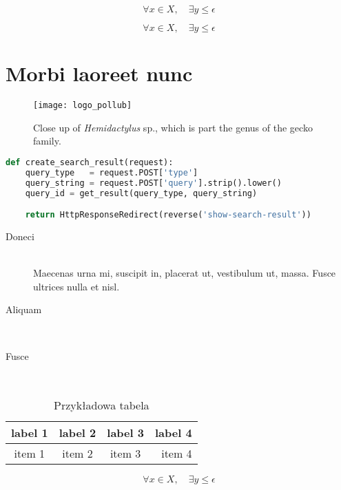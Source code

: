 \lipsum[6]

\begin{equation}
 \forall x \in X, \quad \exists y \leq \epsilon
\end{equation}

\lipsum[7]

\begin{equation}
 \forall x \in X, \quad \exists y \leq \epsilon
\end{equation}

\lipsum[8]

\section{Morbi laoreet nunc}

\lipsum[9]

\begin{figure}[ht]
  \centering
  \texttt{[image: logo\_pollub]}
  \caption[Close up of \textit{Hemidactylus} sp.]%
  {Close up of \textit{Hemidactylus} sp., which is
  part the genus of the gecko family.}
\end{figure}

\lipsum[10]

\begin{lstlisting}[language=Python,caption={Przykładowy listing},label=lst:somelabel]
def create_search_result(request):
    query_type   = request.POST['type']
    query_string = request.POST['query'].strip().lower()
    query_id = get_result(query_type, query_string)

    return HttpResponseRedirect(reverse('show-search-result'))
\end{lstlisting}

\lipsum[11]


\begin{description}
  \item[Doneci]\hfill\\
    {Maecenas urna mi, suscipit in, placerat ut, vestibulum ut, massa. Fusce ultrices nulla et nisl.}
  \item[Aliquam]\hfill\\
    {\lipsum[15]}
  \item[Fusce]\hfill\\
    {\lipsum[14]}
\end{description}


\begin{table}[h]
  \center
  \caption{Przykładowa tabela}
  \label{my_table}
  \begin{tabular}{ | c | c | c | r | }
    \hline
  label 1 & label 2 & label 3 & label 4 \\
  \hline
  item 1  & item 2  & item 3  & item 4  \\
  \hline
  \end{tabular}
\end{table}

\lipsum[12]

\begin{equation}
 \forall x \in X, \quad \exists y \leq \epsilon
\end{equation}

\lipsum[13]
